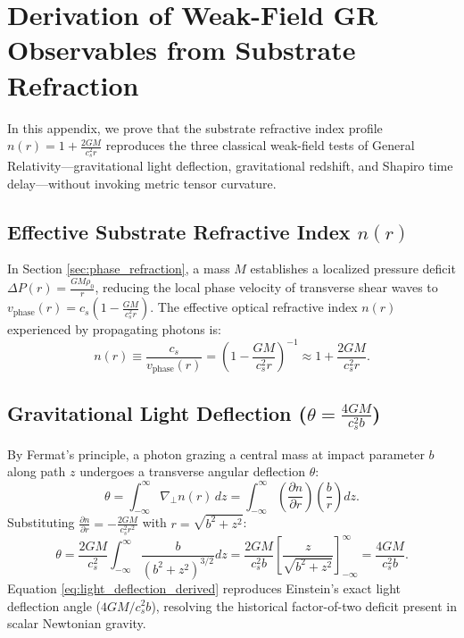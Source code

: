 \documentclass[11pt,a4paper]{article}
\begin{document}
	
	\section{Derivation of Weak-Field GR Observables from Substrate Refraction}
	\label{app:weak_field_gr}
	
	In this appendix, we prove that the substrate refractive index profile $n(r) = 1 + \frac{2GM}{c_s^2 r}$ reproduces the three classical weak-field tests of General Relativity—gravitational light deflection, gravitational redshift, and Shapiro time delay—without invoking metric tensor curvature.
	
	\subsection{Effective Substrate Refractive Index $n(r)$}
	In Section \ref{sec:phase_refraction}, a mass $M$ establishes a localized pressure deficit $\Delta P(r) = \frac{G M \rho_0}{r}$, reducing the local phase velocity of transverse shear waves to $v_{\text{phase}}(r) = c_s \left(1 - \frac{GM}{c_s^2 r}\right)$. The effective optical refractive index $n(r)$ experienced by propagating photons is:
	\begin{equation}
		n(r) \equiv \frac{c_s}{v_{\text{phase}}(r)} = \left( 1 - \frac{GM}{c_s^2 r} \right)^{-1} \approx 1 + \frac{2GM}{c_s^2 r}.
		\label{eq:n_refractive_index_app}
	\end{equation}
	
	\subsection{Gravitational Light Deflection ($\theta = \frac{4GM}{c_s^2 b}$)}
	By Fermat's principle, a photon grazing a central mass at impact parameter $b$ along path $z$ undergoes a transverse angular deflection $\theta$:
	\begin{equation}
		\theta = \int_{-\infty}^{\infty} \nabla_\perp n(r) \, dz = \int_{-\infty}^{\infty} \left( \frac{\partial n}{\partial r} \right) \left( \frac{b}{r} \right) dz.
	\end{equation}
	Substituting $\frac{\partial n}{\partial r} = -\frac{2GM}{c_s^2 r^2}$ with $r = \sqrt{b^2 + z^2}$:
	\begin{equation}
		\theta = \frac{2GM}{c_s^2} \int_{-\infty}^{\infty} \frac{b}{(b^2 + z^2)^{3/2}} dz = \frac{2GM}{c_s^2 b} \left[ \frac{z}{\sqrt{b^2 + z^2}} \right]_{-\infty}^{\infty} = \frac{4GM}{c_s^2 b}.
		\label{eq:light_deflection_derived}
	\end{equation}
	Equation \eqref{eq:light_deflection_derived} reproduces Einstein's exact light deflection angle ($4GM/c_s^2 b$), resolving the historical factor-of-two deficit present in scalar Newtonian gravity.
	
\end{document}
